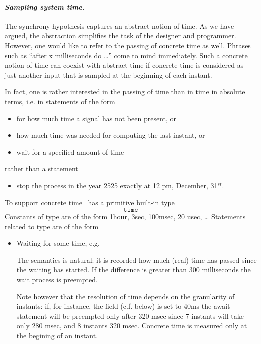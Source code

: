 {\em
\paragraph{\textit{Sampling system time.}} 
The synchrony hypothesis captures an abstract notion of time.  As we 
have argued, the abstraction simplifies the task of the designer and 
programmer.  However, one would like to refer to the passing of 
concrete time as well.  Phrases such as ``after x milliseconds do 
\ldots'' come to mind immediately.  Such a concrete notion of time can coexist with abstract time if concrete time is considered as just another input that is sampled at the beginning of each instant. 

In fact, one is rather interested in the passing of time than in time
in absolute terms, i.e. in statements of the form
\begin{itemize}
  \item for how much time a signal has not been present, or
  \item how much time was needed for computing the last instant, or
  \item wait for a specified amount of time
\end{itemize}
rather than a statement
\begin{itemize}
  \item stop the process in the year 2525 exactly at 12 pm, December, 31$^{st}$. 
\end{itemize}
To support concrete time \se\ has a primitive built-in type
% 
$$\mathtt{time}$$
% 
Constants of type  are of the form
%
\BEP
                  1hour, 3sec, 100msec, 20 usec, \ldots
\EEP
% 
Statements related to type  are of the form
\begin{itemize}
  \item   Waiting for some time, e.g.
    \begin{quote}
    \end{quote}
	The semantics is natural: it is recorded
	 how much (real) time has passed since the waiting has started.  If the
	 difference is greater than $300$ milliseconds the
     wait process is preempted. 
     
     Note however that the resolution of time depends on the granularity
     of instants: if, for instance, the field  (c.f. below) is set
     to 40ms the await statement will be preempted only after 320 msec since
     7 instants will take only 280 msec, and 8 instants 320 msec. Concrete
     time is measured only at the begining of an instant.


\end{itemize}}
